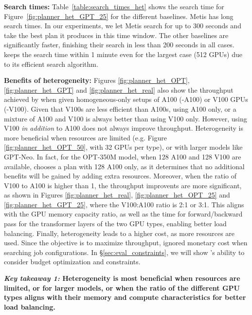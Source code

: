 \textbf{Search times:} Table~\ref{table:search_times_het} shows the search time for Figure~\ref{fig:planner_het_GPT_25} for the different baselines. Metis has long search times. In our experiments, we let Metis search for up to 300 seconds and take the best plan it produces in this time window. The other baselines are significantly faster, finishing their search in less than 200 seconds in all cases. \sailor keeps the search time within 1 minute even for the largest case (512 GPUs) due to its efficient search algorithm. 





\textbf{Benefits of heterogeneity:} 
Figures \ref{fig:planner_het_OPT}, \ref{fig:planner_het_GPT} and \ref{fig:planner_het_real} also show the throughput achieved by \sailor when given homogeneous-only setups of A100 (\sailor-A100) or V100 GPUs (\sailor-V100). Given that V100s are less efficient than A100s, using A100 only, or a mixture of A100 and V100 is always better than using V100 only. However, using V100 \textit{in addition} to A100 does not always improve throughput. Heterogeneity is more beneficial when resources are limited (e.g. Figure \ref{fig:planner_het_OPT_50}, with 32 GPUs per type), or with larger models like GPT-Neo. In fact, for the OPT-350M model, when 128 A100 and 128 V100 are available, \sailor chooses a plan with 128 A100 only, as it determines that no additional benefits will be gained by adding extra resources. Moreover, when the ratio of V100 to A100 is higher than 1, the throughput improvents are more significant, as shown in Figures \ref{fig:planner_het_real}, \ref{fig:planner_het_OPT_25} and \ref{fig:planner_het_GPT_25}, where the V100:A100 ratio is 2:1 or 3:1. This aligns with the GPU memory capacity ratio, as well as the time for forward/backward pass for the transformer layers of the two GPU types, enabling better load balancing. Finally, heterogeneity leads to a higher cost, as more resources are used. Since the objective is to maximize throughput, \sailor ignored monetary cost when searching job configurations. In \S\ref{sec:eval_constraints}, we will show \sailor's ability to consider budget optimization and constraints.


\textbf{\textit{Key takeaway 1:} Heterogeneity is most beneficial when resources are limited, or for larger models, or when the ratio of the different GPU types aligns with their memory and compute characteristics for better load balancing.}





